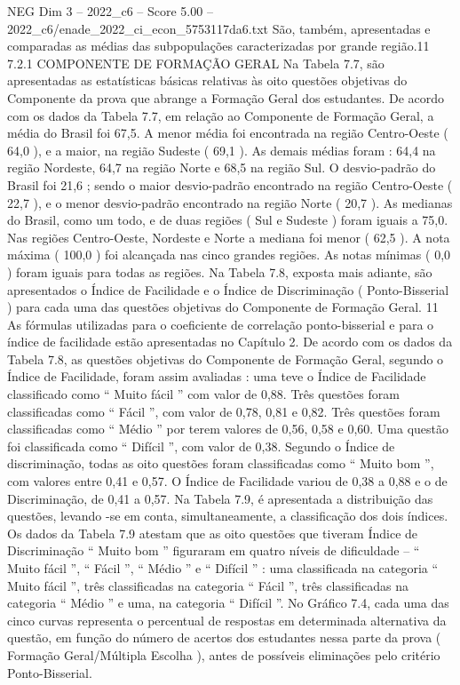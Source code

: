 \begin{textsample}{NEG Dim 3 – 2022\_c6 – Score 5.00 – 2022\_c6/enade\_2022\_ci\_econ\_5753117da6.txt}
São, também, apresentadas e comparadas as médias das subpopulações caracterizadas por grande região.11 7.2.1 COMPONENTE DE FORMAÇÃO GERAL Na Tabela 7.7, são apresentadas as estatísticas básicas relativas às oito questões objetivas do Componente da prova que abrange a Formação Geral dos estudantes.
De acordo com os dados da Tabela 7.7, em relação ao Componente de Formação Geral, a média do Brasil foi 67,5.
A menor média foi encontrada na região Centro-Oeste ( 64,0 ), e a maior, na região Sudeste ( 69,1 ).
As demais médias foram : 64,4 na região Nordeste, 64,7 na região Norte e 68,5 na região Sul.
O desvio-padrão do Brasil foi 21,6 ; sendo o maior desvio-padrão encontrado na região Centro-Oeste ( 22,7 ), e o menor desvio-padrão encontrado na região Norte ( 20,7 ).
As medianas do Brasil, como um todo, e de duas regiões ( Sul e Sudeste ) foram iguais a 75,0.
Nas regiões Centro-Oeste, Nordeste e Norte a mediana foi menor ( 62,5 ).
A nota máxima ( 100,0 ) foi alcançada nas cinco grandes regiões.
As notas mínimas ( 0,0 ) foram iguais para todas as regiões.
Na Tabela 7.8, exposta mais adiante, são apresentados o Índice de Facilidade e o Índice de Discriminação ( Ponto-Bisserial ) para cada uma das questões objetivas do Componente de Formação Geral. 11 As fórmulas utilizadas para o coeficiente de correlação ponto-bisserial e para o índice de facilidade estão apresentadas no Capítulo 2.
De acordo com os dados da Tabela 7.8, as questões objetivas do Componente de Formação Geral, segundo o Índice de Facilidade, foram assim avaliadas : uma teve o Índice de Facilidade classificado como “ Muito fácil ” com valor de 0,88.
Três questões foram classificadas como “ Fácil ”, com valor de 0,78, 0,81 e 0,82.
Três questões foram classificadas como “ Médio ” por terem valores de 0,56, 0,58 e 0,60.
Uma questão foi classificada como “ Difícil ”, com valor de 0,38.
Segundo o Índice de discriminação, todas as oito questões foram classificadas como “ Muito bom ”, com valores entre 0,41 e 0,57.
O Índice de Facilidade variou de 0,38 a 0,88 e o de Discriminação, de 0,41 a 0,57.
Na Tabela 7.9, é apresentada a distribuição das questões, levando -se em conta, simultaneamente, a classificação dos dois índices.
Os dados da Tabela 7.9 atestam que as oito questões que tiveram Índice de Discriminação “ Muito bom ” figuraram em quatro níveis de dificuldade – “ Muito fácil ”, “ Fácil ”, “ Médio ” e “ Difícil ” : uma classificada na categoria “ Muito fácil ”, três classificadas na categoria “ Fácil ”, três classificadas na categoria “ Médio ” e uma, na categoria “ Difícil ”.
No Gráfico 7.4, cada uma das cinco curvas representa o percentual de respostas em determinada alternativa da questão, em função do número de acertos dos estudantes nessa parte da prova ( Formação Geral/Múltipla Escolha ), antes de possíveis eliminações pelo critério Ponto-Bisserial.

\end{textsample}

